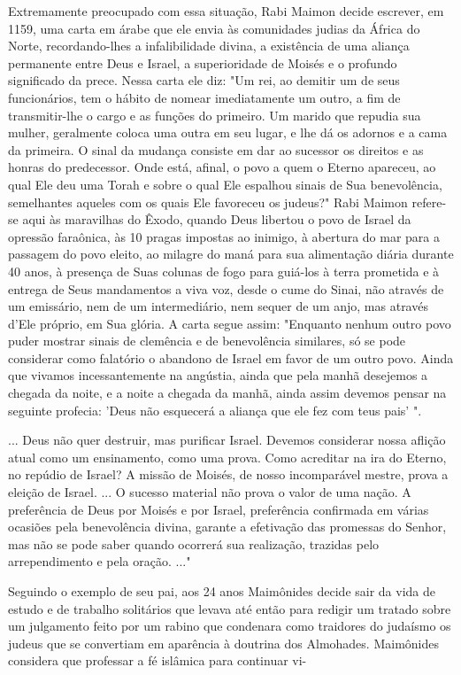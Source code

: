 \begin{itemize}
Extremamente preocupado com essa situação, Rabi Maimon decide escrever,
em 1159, uma carta em árabe que ele envia às comunidades judias da
África do Norte, recordando-lhes a infalibilidade divina, a existência
de uma aliança permanente entre Deus e Israel, a superioridade de Moisés
e o profun­do significado da prece. Nessa carta ele diz: "Um rei, ao
demitir um de seus funcionários, tem o hábito de nomear imediatamente um
outro, a fim de transmitir-lhe o cargo e as funções do primeiro. Um
marido que repudia sua mulher, geralmente coloca uma outra em seu lugar,
e lhe dá os adornos e a ca­ma da primeira. O sinal da mudança consiste
em dar ao sucessor os direitos e as honras do predecessor. Onde está,
afinal, o povo a quem o Eterno apare­ceu, ao qual Ele deu uma Torah e
sobre o qual Ele espalhou sinais de Sua bene­volência, semelhantes
aqueles com os quais Ele favoreceu os judeus?" Rabi Mai­mon refere-se
aqui às maravilhas do Êxodo, quando Deus libertou o povo de Israel da
opressão faraônica, às 10 pragas impostas ao inimigo, à abertura do mar
para a passagem do povo eleito, ao milagre do maná para sua alimentação
diária durante 40 anos, à presença de Suas colunas de fogo para guiá-los
à terra prometida e à entrega de Seus mandamentos a viva voz, desde o
cume do Si­nai, não através de um emissário, nem de um intermediário,
nem sequer de um anjo, mas através d'Ele próprio, em Sua glória. A carta
segue assim: "Enquanto nenhum outro povo puder mostrar sinais de
clemência e de benevolência simi­lares, só se pode considerar como
falatório o abandono de Israel em favor de um outro povo. Ainda que
vivamos incessantemente na angústia, ainda que pe­la manhã desejemos a
chegada da noite, e a noite a chegada da manhã, ainda assim devemos
pensar na seguinte profecia: 'Deus não esquecerá a aliança que ele fez
com teus pais' ".

... Deus não quer destruir, mas purificar Israel. Devemos conside­rar
nossa aflição atual como um ensinamento, como uma prova. Como acredi­tar
na ira do Eterno, no repúdio de Israel? A missão de Moisés, de nosso
incom­parável mestre, prova a eleição de Israel. ... O sucesso material
não prova o valor de uma nação. A preferência de Deus por Moisés e por
Israel, preferência confirmada em várias ocasiões pela benevolência
divina, garante a efetivação das promessas do Senhor, mas não se pode
saber quando ocorrerá sua realiza­ção, trazidas pelo arrependimento e
pela oração. ..."

Seguindo o exemplo de seu pai, aos 24 anos Maimônides decide sair da
vida de estudo e de trabalho solitários que levava até então para
redigir um tratado sobre um julgamento feito por um rabino que condenara
como traido­res do judaísmo os judeus que se convertiam em aparência à
doutrina dos Al­mohades. Maimônides considera que professar a fé
islâmica para continuar vi-


\end{itemize}
